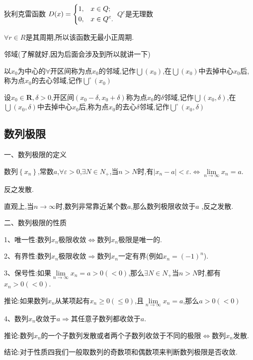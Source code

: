 \documentclass[utf8]{ctexart}
\begin{document}
狄利克雷函数
$D(x) = 
\begin{dcases}
  1,&x \in Q;\\0,&x \in Q^c.    
  \end{dcases}$
$Q^c$是无理数

$\forall r \in R$是其周期,所以该函数无最小正周期.

邻域(了解就好,因为后面会涉及到所以就讲一下)

以$x_{0}$为中心的$\forall $开区间称为点$x_{0}$的邻域,记作$\bigcup (x_{0})$,在$\bigcup (x_{0})$中去掉中心$x_{0}$后,称为点$x_{0}$的去心邻域,记作$\bigcup \limits^{\circ }(x_{0})$

设$x_{0}\in \mathbf{R} ,\delta >0$,开区间$(x_{0}-\delta ,x_{0}+\delta ) $称为点$x_{0}$的$\delta $邻域,记作$\bigcup (x_{0},\delta )$,在$\bigcup (x_{0},\delta )$中去掉中心$x_{0}$后,称为点$x_{0}$的去心$\delta $邻域,记作$\bigcup \limits^{\circ }(x_{0},\delta )$

\newpage 

\subsection{\heiti 数列极限}

一、数列极限的定义

数列$\left\{x_{n}\right\} $,常数$a$,$\forall \varepsilon >0$,$\exists N\in  N_{+}$,当$n>N$时,有$|x_{n}-a|<\varepsilon .\Leftrightarrow \lim\limits_{n\to \infty }x_{n}=a .$

反之发散.

直观上,当$n\to \infty $时,数列非常靠近某个数$a$,那么数列极限收敛于$a$ ,反之发散.

二、数列极限的性质

1、唯一性:数列$x_{n}$极限收敛$\Leftrightarrow $数列$x_{n}$极限是唯一的.

2、有界性:数列$x_{n}$极限收敛$\Rightarrow $数列$x_{n}$一定有界(例如$x_{n}=(-1)^{n}$).

3、保号性:如果$\lim \limits_{n\to \infty}x_{n}=a>0(<0)$,那么$\exists N\in N_{+}$当$n>N$时,都有$x_{n}>0(<0)$.

推论:如果数列$x_{n}$从某项起有$x_{n}\geqslant 0(\leqslant 0)$,且$\lim \limits_{n\to \infty}x_{n}=a$,那么$a>0(<0)$

4、数列$x_{n}$收敛于$a\Rightarrow $其任意子数列都收敛于$a$.

推论:数列$x_{n}$的一个子数列发散或者两个子数列收敛于不同的极限$\Leftrightarrow $数列$x_{n}$发散.

结论:对于性质四我们一般取数列的奇数项和偶数项来判断数列极限是否收敛.
\end{document}
